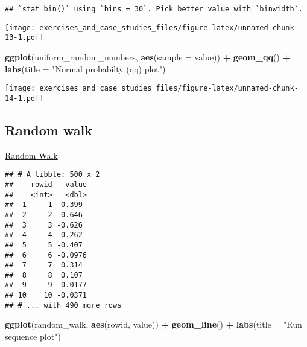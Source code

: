 \documentclass[]{book}
\newenvironment{Shaded}{\begin{snugshade}}{\end{snugshade}}
\newcommand{\DataTypeTok}[1]{\textcolor[rgb]{0.13,0.29,0.53}{#1}}
\newcommand{\DecValTok}[1]{\textcolor[rgb]{0.00,0.00,0.81}{#1}}
\newcommand{\KeywordTok}[1]{\textcolor[rgb]{0.13,0.29,0.53}{\textbf{#1}}}
\newcommand{\NormalTok}[1]{#1}
\newcommand{\OperatorTok}[1]{\textcolor[rgb]{0.81,0.36,0.00}{\textbf{#1}}}
\newcommand{\StringTok}[1]{\textcolor[rgb]{0.31,0.60,0.02}{#1}}
\theoremstyle{definition}
\theoremstyle{definition}
\theoremstyle{definition}
\theoremstyle{remark}
\begin{document}
\begin{verbatim}
## `stat_bin()` using `bins = 30`. Pick better value with `binwidth`.
\end{verbatim}

\texttt{[image: exercises\_and\_case\_studies\_files/figure-latex/unnamed-chunk-13-1.pdf]}

\begin{Shaded}
\begin{Highlighting}[]
\KeywordTok{ggplot}\NormalTok{(uniform_random_numbers, }\KeywordTok{aes}\NormalTok{(}\DataTypeTok{sample =}\NormalTok{ value)) }\OperatorTok{+}
\StringTok{  }\KeywordTok{geom_qq}\NormalTok{() }\OperatorTok{+}
\StringTok{  }\KeywordTok{labs}\NormalTok{(}\DataTypeTok{title =} \StringTok{"Normal probabilty (qq) plot"}\NormalTok{)}
\end{Highlighting}
\end{Shaded}

\texttt{[image: exercises\_and\_case\_studies\_files/figure-latex/unnamed-chunk-14-1.pdf]}

\hypertarget{random-walk}{%
\subsection{Random walk}\label{random-walk}}

\href{https://www.itl.nist.gov/div898/handbook/eda/section4/eda4231.htm}{Random
Walk}

\begin{Shaded}
\end{Shaded}

\begin{verbatim}
## # A tibble: 500 x 2
##    rowid   value
##    <int>   <dbl>
##  1     1 -0.399 
##  2     2 -0.646 
##  3     3 -0.626 
##  4     4 -0.262 
##  5     5 -0.407 
##  6     6 -0.0976
##  7     7  0.314 
##  8     8  0.107 
##  9     9 -0.0177
## 10    10 -0.0371
## # ... with 490 more rows
\end{verbatim}

\begin{Shaded}
\begin{Highlighting}[]
\KeywordTok{ggplot}\NormalTok{(random_walk, }\KeywordTok{aes}\NormalTok{(rowid, value)) }\OperatorTok{+}
\StringTok{  }\KeywordTok{geom_line}\NormalTok{() }\OperatorTok{+}
\StringTok{  }\KeywordTok{labs}\NormalTok{(}\DataTypeTok{title =} \StringTok{"Run sequence plot"}\NormalTok{)}
\end{Highlighting}
\end{Shaded}
\end{document}

